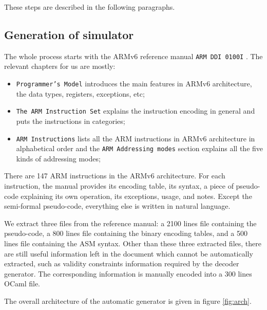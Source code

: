 \documentclass[a4paper, conference]{IEEEtran}
\newcommand{\stt}{\small\tt}
\begin{document}
These steps are described in the following paragraphs.

\subsection{Generation of simulator}

The whole process starts with the ARMv6 reference manual {\stt ARM DDI 0100I}
\cite{arm6refman}. The relevant chapters for us are mostly:
\begin{itemize}
\item
\texttt{Programmer's Model} introduces the main features in ARMv6 architecture,
the data types, registers, exceptions, etc;
\item
\texttt{The ARM Instruction Set}
explains the instruction encoding in general and puts the instructions in
categories;
\item \texttt{ARM Instructions} lists all the ARM instructions in
  ARMv6 architecture in alphabetical order and the \texttt{ARM
    Addressing modes} section explains all the five kinds of
  addressing modes;
\end{itemize}

There are 147 ARM instructions in the ARMv6 architecture.  For each
instruction, the manual provides its encoding table, its syntax, a
piece of pseudo-code explaining its own operation, its exceptions,
usage, and notes.  Except the semi-formal pseudo-code, everything else
is written in natural language.

We extract three files from the reference manual: a 2100 lines file
containing the pseudo-code, a 800 lines file containing the binary
encoding tables, and a 500 lines file containing the ASM syntax.
Other than these three extracted files, there are still useful
information left in the document which cannot be automatically
extracted, such as validity constraints information required by the
decoder generator.  The corresponding information is manually encoded
into a 300 lines OCaml file.

The overall architecture of the automatic generator is given in figure
\ref{fig:arch}.
\end{document}
